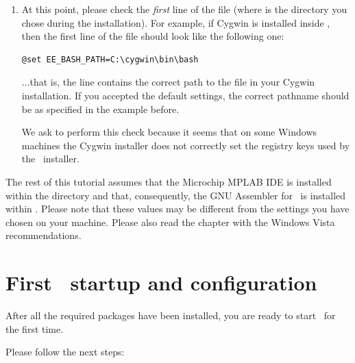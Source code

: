 \begin{enumerate}
\item At this point, please check the {\em first} line of the file
   (where 
  is the directory you chose during the installation). For example,
  if Cygwin is installed inside , then the first line
  of the file should look like the following one:
\begin{lstlisting}
@set EE_BASH_PATH=C:\cygwin\bin\bash
\end{lstlisting}
  ...that is, the line contains the correct path to the
   file in your Cygwin installation. If you accepted
  the default settings, the correct pathname should be
   as specified in the example before.
  \begin{note}
    We ask to perform this check because it seems that on some Windows
    machines the Cygwin installer does not correctly set the registry
    keys used by the \ee\ installer.
  \end{note}
\end{enumerate}

The rest of this tutorial assumes that the Microchip MPLAB IDE is
installed within the  directory and
that, consequently, the GNU Assembler for \dspic\ is installed within
. Please note
that these values may be different from the settings you have chosen
on your machine. Please also read the chapter with the Windows Vista
recommendations.

\chapter{First \rtd\ startup and configuration}

After all the required packages have been installed, you are ready to
start \rtd\ for the first time.

Please follow the next steps:

